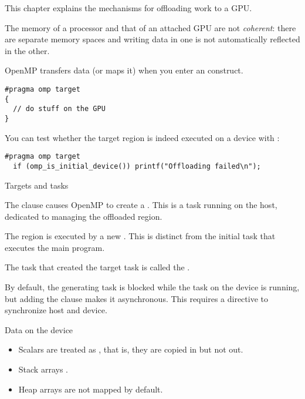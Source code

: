 
This chapter explains the mechanisms for offloading work to a \acf{GPU}.

The memory of a processor and that of an attached \ac{GPU} are not
\emph{coherent}:
there are separate memory spaces and writing data in one
is not automatically reflected in the other.

OpenMP transfers data (or maps it) when you enter an 
construct.
\begin{lstlisting}
#pragma omp target
{
  // do stuff on the GPU
}
\end{lstlisting}

You can test whether the target region is indeed executed on a device
with :
\begin{lstlisting}
#pragma omp target
  if (omp_is_initial_device()) printf("Offloading failed\n");
\end{lstlisting}

 {Targets and tasks}

The  clause causes OpenMP to create a
.
This is a task running on the host, dedicated to managing the
offloaded region.

The  region is executed
by a new .
This is distinct from the initial task that executes the main program.

The task that created the target task is called the
.

By default, the generating task is blocked while the task on the device is running,
but adding the  clause makes it asynchronous.
This requires a  directive to synchronize host and device.

 {Data on the device}

\begin{itemize}
\item Scalars are treated as , that is,
  they are copied in but not out.
\item Stack arrays .
\item Heap arrays are not mapped by default.
\end{itemize}

